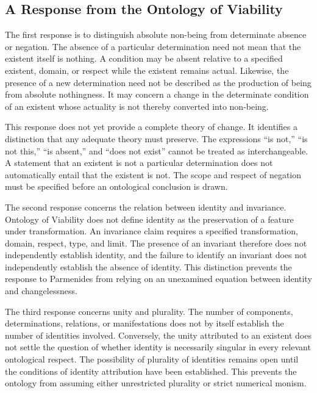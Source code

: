 \subsection{A Response from the Ontology of Viability}


The first response is to distinguish absolute
non-being from determinate absence or
negation. The absence of a particular
determination need not mean that the
existent itself is nothing. A condition
may be absent relative to a specified
existent, domain, or respect while the
existent remains actual. Likewise, the
presence of a new determination need
not be described as the production of
being from absolute nothingness. It may
concern a change in the determinate
condition of an existent whose actuality
is not thereby converted into non-being.


This response does not yet provide a
complete theory of change. It identifies
a distinction that any adequate theory
must preserve. The expressions ``is not,''
``is not this,'' ``is absent,'' and
``does not exist'' cannot be treated as
interchangeable. A statement that an
existent is not a particular determination
does not automatically entail that the
existent is not. The scope and respect
of negation must be specified before
an ontological conclusion is drawn.


The second response concerns the relation
between identity and invariance. Ontology
of Viability does not define identity as
the preservation of a feature under
transformation. An invariance claim
requires a specified transformation,
domain, respect, type, and limit. The
presence of an invariant therefore does
not independently establish identity,
and the failure to identify an invariant
does not independently establish the
absence of identity. This distinction
prevents the response to Parmenides
from relying on an unexamined equation
between identity and changelessness.


The third response concerns unity and
plurality. The number of components,
determinations, relations, or manifestations
does not by itself establish the number
of identities involved. Conversely, the
unity attributed to an existent does not
settle the question of whether identity
is necessarily singular in every relevant
ontological respect. The possibility of
plurality of identities remains open
until the conditions of identity attribution
have been established. This prevents
the ontology from assuming either
unrestricted plurality or strict numerical
monism.

